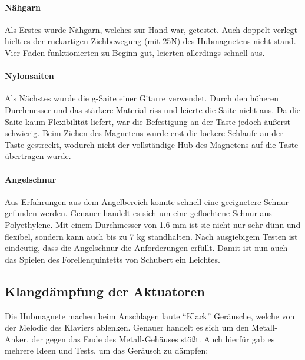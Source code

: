 \paragraph{Nähgarn}

Als Erstes wurde Nähgarn, welches zur Hand war, getestet.
Auch doppelt verlegt hielt es der ruckartigen Ziehbewegung (mit 25N) des Hubmagnetens nicht stand.
Vier Fäden funktionierten zu Beginn gut, leierten allerdings schnell aus.

\paragraph{Nylonsaiten}

Als Nächstes wurde die g-Saite einer Gitarre verwendet.
Durch den höheren Durchmesser und das stärkere Material riss und leierte die Saite nicht aus.
Da die Saite kaum Flexibilität liefert, war die Befestigung an der Taste jedoch äußerst schwierig.
Beim Ziehen des Magnetens wurde erst die lockere Schlaufe an der Taste gestreckt, wodurch nicht der vollständige Hub des Magnetens auf die Taste übertragen wurde.

\paragraph{Angelschnur}

Aus Erfahrungen aus dem Angelbereich konnte schnell eine geeignetere Schnur gefunden werden.
Genauer handelt es sich um eine geflochtene Schnur aus Polyethylene.
Mit einem Durchmesser von 1.6 mm ist sie nicht nur sehr dünn und flexibel, sondern kann auch bis zu 7 kg standhalten.
Nach ausgiebigem Testen ist eindeutig, dass die Angelschnur die Anforderungen erfüllt.
Damit ist nun auch das Spielen des Forellenquintetts von Schubert ein Leichtes.

\subsection{Klangdämpfung der Aktuatoren}
Die Hubmagnete machen beim Anschlagen laute \enquote{Klack} Geräusche, welche von der Melodie des Klaviers ablenken.
Genauer handelt es sich um den Metall-Anker, der gegen das Ende des Metall-Gehäuses stößt.
Auch hierfür gab es mehrere Ideen und Tests, um das Geräusch zu dämpfen:

